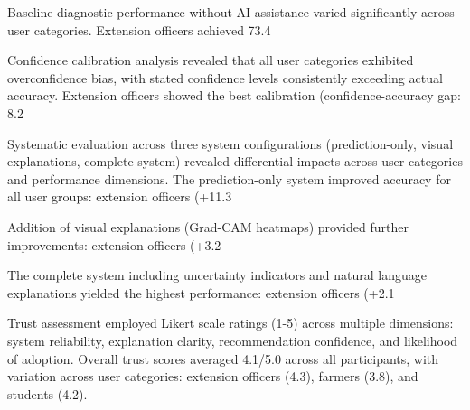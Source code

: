 \documentclass[agriculture,article,submit,pdftex,moreauthors]{Definitions/mdpi}
\begin{document}
Baseline diagnostic performance without AI assistance varied significantly across user categories. Extension officers achieved 73.4%

Confidence calibration analysis revealed that all user categories exhibited overconfidence bias, with stated confidence levels consistently exceeding actual accuracy. Extension officers showed the best calibration (confidence-accuracy gap: 8.2%


Systematic evaluation across three system configurations (prediction-only, visual explanations, complete system) revealed differential impacts across user categories and performance dimensions. The prediction-only system improved accuracy for all user groups: extension officers (+11.3%

Addition of visual explanations (Grad-CAM heatmaps) provided further improvements: extension officers (+3.2%

The complete system including uncertainty indicators and natural language explanations yielded the highest performance: extension officers (+2.1%


Trust assessment employed Likert scale ratings (1-5) across multiple dimensions: system reliability, explanation clarity, recommendation confidence, and likelihood of adoption. Overall trust scores averaged 4.1/5.0 across all participants, with variation across user categories: extension officers (4.3), farmers (3.8), and students (4.2).
\end{document}

